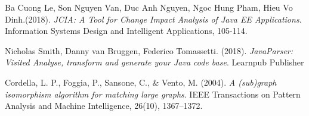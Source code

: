 \documentclass[12pt]{report}
\begin{document}
\begin{thebibliography}{9}
	Ba Cuong Le, Son Nguyen Van, Duc Anh Nguyen, Ngoc Hung Pham, Hieu Vo Dinh.(2018). \textit{JCIA: A Tool for Change Impact Analysis of Java EE Applications}. Information Systems Design and Intelligent Applications, 105-114.
	
	Nicholas Smith, Danny van Bruggen, Federico Tomassetti. (2018).
	\textit{JavaParser: Visited Analyse, transform and generate your Java code base}. Learnpub Publisher
		
	Cordella, L. P., Foggia, P., Sansone, C., \& Vento, M. (2004). \textit{ A (sub)graph isomorphism algorithm for matching large graphs}. IEEE Transactions on Pattern Analysis and Machine Intelligence, 26(10), 1367–1372.
	
\end{thebibliography}
\end{document}
